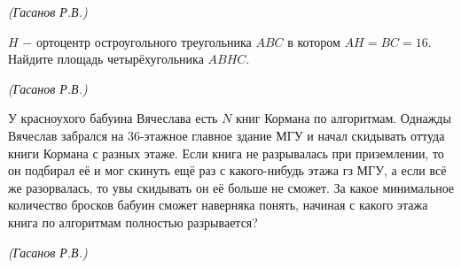 \hspace{3mm}

\begin{flushright}
    \textit{\small{(Гасанов Р.В.)}}
\end{flushright}

$H$ $-$ ортоцентр остроугольного треугольника $ABC$ в котором $AH = BC = 16$. Найдите площадь четырёхугольника $ABHC$.

\begin{flushright}
    \textit{\small{(Гасанов Р.В.)}}
\end{flushright}

\newpage

\hspace{3mm}

У красноухого бабуина Вячеслава есть $N$ книг Кормана по алгоритмам. Однажды Вячеслав забрался на 36-этажное главное здание МГУ и начал скидывать оттуда книги Кормана с разных этаже. Если книга не разрывалась при приземлении, то он подбирал её и мог скинуть ещё раз с какого-нибудь этажа гз МГУ, а если всё же разорвалась, то увы скидывать он её больше не сможет. За какое минимальное количество бросков бабуин сможет наверняка понять, начиная с какого этажа книга по алгоритмам полностью разрывается?
\begin{flushright}
    \textit{\small{(Гасанов Р.В.)}}
\end{flushright}